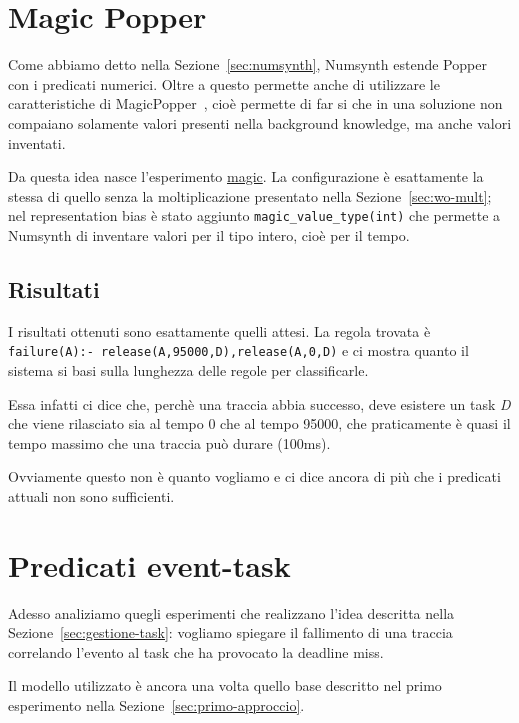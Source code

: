 \section{Magic Popper}
\label{sec:magic-popper}
Come abbiamo detto nella Sezione~\ref{sec:numsynth}, Numsynth estende Popper con i predicati numerici. Oltre a questo permette anche di utilizzare le caratteristiche di MagicPopper~\cite{hocquette2023learning}, cioè permette di far si che in una soluzione non compaiano solamente valori presenti nella background knowledge, ma anche valori inventati.

Da questa idea nasce l'esperimento \href{https://github.com/edoardosarri24/numsynth/tree/main/my-experiments/5-magic/}{magic}. La configurazione è esattamente la stessa di quello senza la moltiplicazione presentato nella Sezione~\ref{sec:wo-mult}; nel representation bias è stato aggiunto \texttt{magic\_value\_type(int)} che permette a Numsynth di inventare valori per il tipo intero, cioè per il tempo.

\subsection{Risultati}
I risultati ottenuti sono esattamente quelli attesi. La regola trovata è \texttt{failure(A):- release(A,95000,D),release(A,0,D)} e ci mostra quanto il sistema si basi sulla lunghezza delle regole per classificarle.

Essa infatti ci dice che, perchè una traccia abbia successo, deve esistere un task \textit{D} che viene rilasciato sia al tempo 0 che al tempo 95000, che praticamente è quasi il tempo massimo che una traccia può durare (100ms).

Ovviamente questo non è quanto vogliamo e ci dice ancora di più che i predicati attuali non sono sufficienti.

\section{Predicati event-task}
\label{sec:event_task}
Adesso analiziamo quegli esperimenti che realizzano l'idea descritta nella Sezione~\ref{sec:gestione-task}: vogliamo spiegare il fallimento di una traccia correlando l'evento al task che ha provocato la deadline miss.

Il modello utilizzato è ancora una volta quello base descritto nel primo esperimento nella Sezione~\ref{sec:primo-approccio}.

\myskip


